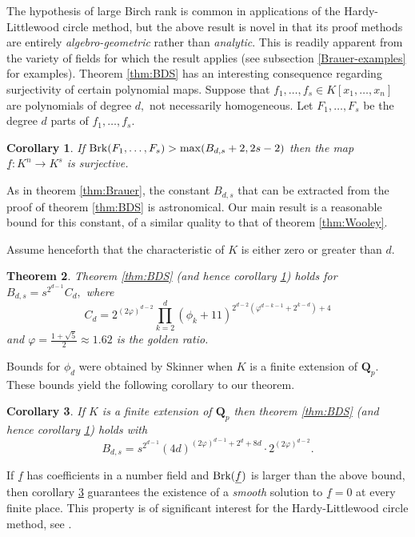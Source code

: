 \documentclass[12pt]{amsart}
\let\ul\underline
\newtheorem{theorem}{Theorem}[section]
\newtheorem{corollary}[theorem]{Corollary}
\theoremstyle{definition}
\newcommand{\Q}{\mathbf{Q}}
\newcommand{\brk}{\textnormal{Brk}}
\let\ul\underline
\begin{document}
The hypothesis of large Birch rank is common in applications of the Hardy-Littlewood circle method, but the above result is novel in that its proof methods are entirely \emph{algebro-geometric} rather than \emph{analytic}. This is readily apparent from the variety of fields for which the result applies (see subsection \ref{Brauer-examples} for examples). Theorem \ref{thm:BDS} has an interesting consequence regarding surjectivity of certain polynomial maps. Suppose that $f_1,\ldots,f_s\in K[x_1,\ldots,x_n]$ are polynomials of degree $d,$ not necessarily homogeneous. Let $F_1,\ldots,F_s$ be the degree $d$ parts of $f_1,\ldots,f_s.$

\begin{corollary}\label{cor:surj}
    If $\brk(F_1,\ldots,F_s) > \max(B_{d,s}+2, 2s-2)$ then the map $\ul{f}:K^n\to K^s$ is surjective. 
\end{corollary}

As in theorem \ref{thm:Brauer}, the constant $B_{d,s}$ that can be extracted from the proof of theorem \ref{thm:BDS} is astronomical.  Our main result is a reasonable bound for this constant, of a similar quality to that of theorem \ref{thm:Wooley}.  

Assume henceforth that the characteristic of $K$ is either zero or greater than $d.$

\begin{theorem}\label{thm:main}
Theorem \ref{thm:BDS} (and hence corollary \ref{cor:surj}) holds for $B_{d,s} = s^{2^{d-1}}C_d,$ where
\[
C_d = 2^{(2\varphi)^{d-2}} \prod_{k=2}^d (\phi_k+11)^{2^{d-2}(\varphi^{d-k-1}+2^{k-d})+4}
\]
and $\varphi = \frac{1+\sqrt{5}}{2}\approx 1.62$ is the golden ratio.    
\end{theorem}

Bounds for $\phi_d$ were obtained by Skinner \cite{Skinner-phi} when $K$ is a finite extension of $\Q_p.$ These bounds yield the following corollary to our theorem. 

\begin{corollary}\label{cor:p-adic} 
If $K$ is a finite extension of $\Q_p$ then theorem \ref{thm:BDS} (and hence corollary \ref{cor:surj}) holds with
\[
B_{d,s} = s^{2^{d-1}} (4d)^{(2\varphi)^{d-1}+2^d+8d}  \cdot 2^{(2\varphi)^{d-2}}. 
\]
\end{corollary}

If $\ul{f}$ has coefficients in a number field and $\brk(\ul{f})$ is larger than the above bound, then corollary \ref{cor:p-adic} guarantees the existence of a \emph{smooth} solution to $\ul{f} = 0$ at every finite place. This property is of significant interest for the Hardy-Littlewood circle method, see \cite{Birch,Skinner-HLS}.
\end{document}
